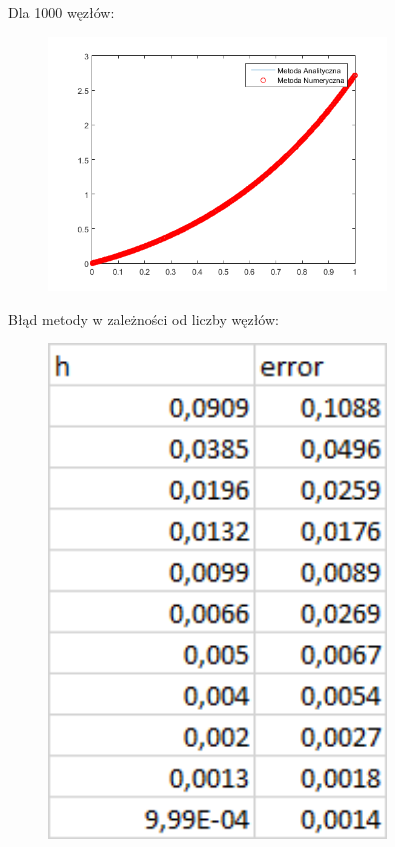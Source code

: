 \begin{samepage}
	Dla 1000 węzłów:
	
	\FloatBarrier
	\begin{figure}[!ht]
		\begin{center}
			\includegraphics[width=0.8\textwidth]{Lab4/charts/zad4/b/1000.png}
		\end{center}
	\end{figure}
	\FloatBarrier
\end{samepage}

\newpage

Błąd metody w zależności od liczby węzłów:

\begin{samepage}
	\FloatBarrier
	\begin{figure}[!ht]
		\begin{center}
			\includegraphics[width=0.8\textwidth]{Lab4/charts/zad4/b/error_dane.png}
		\end{center}
	\end{figure}
	\FloatBarrier
\end{samepage}

